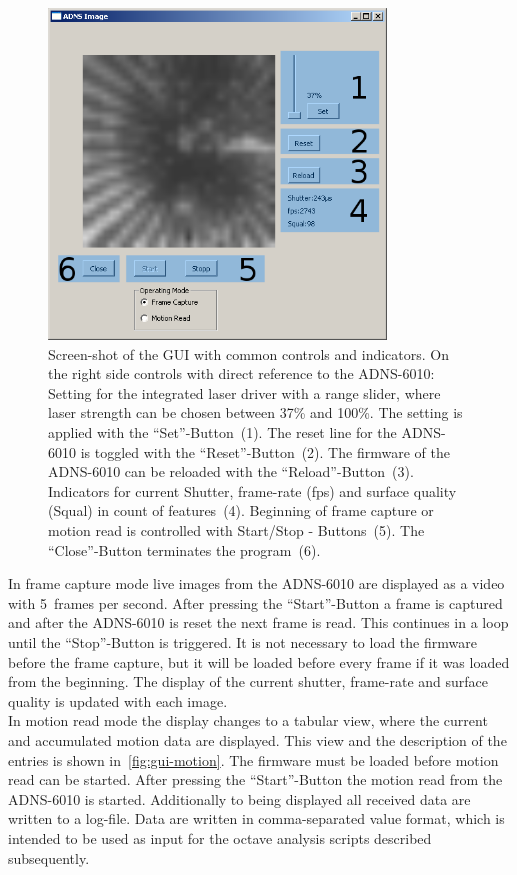 \documentclass[12pt,a4paper]{article}
\begin{document}
\begin{figure}[htbp]
\begin{center}
\includegraphics[width=0.8\textwidth]{figures/gui-common.png}
\caption{\label{fig:gui-common}
Screen-shot of the GUI with common controls and indicators.
On the right side controls with direct reference to the ADNS-6010:
Setting for the integrated laser driver with a range slider, where laser strength can be chosen between 37\% and 100\%. The setting is applied with the ``Set''-Button~(1).
The reset line for the ADNS-6010 is toggled with the ``Reset''-Button~(2).
The firmware of the ADNS-6010 can be reloaded with the ``Reload''-Button~(3).
Indicators for current Shutter, frame-rate (fps) and surface quality (Squal) in count of features~(4).
Beginning of frame capture or motion read is controlled with Start/Stop - Buttons~(5).
The ``Close''-Button terminates the program~(6).
}
\end{center}
\end{figure}

In frame capture mode live images from the ADNS-6010 are displayed as a video with 5~frames per second.
After pressing the ``Start''-Button a frame is captured and after the ADNS-6010 is reset the next frame is read.
This continues in a loop until the ``Stop''-Button is triggered.
It is not necessary to load the firmware before the frame capture, but it will be loaded before every frame if it was loaded from the beginning.
The display of the current shutter, frame-rate and surface quality is updated with each image.\\
In motion read mode the display changes to a tabular view, where the current and accumulated motion data are displayed.
This view and the description of the entries is shown in~\autoref{fig:gui-motion}.
The firmware must be loaded before motion read can be started.
After pressing the ``Start''-Button the motion read from the ADNS-6010 is started.
Additionally to being displayed all received data are written to a log-file.
Data are written in comma-separated value format, which is intended to be used as input for the octave analysis scripts described subsequently.
\end{document}

